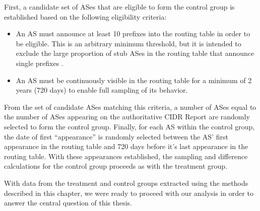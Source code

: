 First, a candidate set of ASes that are eligible to form the control group is
established based on the following eligibility criteria:

\begin{itemize}
    \item{An AS must announce at least 10 prefixes into the routing table in
    order to be eligible. This is an arbitrary minimum threshold, but it is
    intended to exclude the large proportion of stub ASes in the routing table
    that announce single prefixes \cite{6447-table-report}.}
    \item{An AS must be continuously visible in the routing table for a minimum
    of 2 years (720 days) to enable full sampling of its behavior.}
\end{itemize}

From the set of candidate ASes matching this criteria, a number of ASes equal
to the number of ASes appearing on the authoritative CIDR Report are randomly
selected to form the control group. Finally, for each AS within the control
group, the date of first ``appearance'' is randomly selected between the AS'
first appearance in the routing table and 720 days before it's last appearance
in the routing table. With these appearances established, the sampling and
difference calculations for the control group proceeds as with the treatment
group.

With data from the treatment and control groups extracted using the methods
described in this chapter, we were ready to proceed with our analysis in order
to answer the central question of this thesis.

